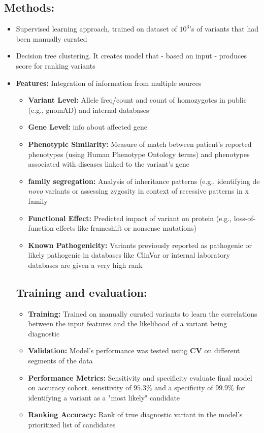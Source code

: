 \documentclass[../main.tex]{subfiles}
\begin{document}
\subsection*{Methods:} 
\begin{itemize}
    \item Supervised learning approach, trained on dataset of $10^3$'s of variants that had been manually curated
    \item Decision tree clustering. It creates model that - based on input - produces score for ranking variants
    \item \textbf{Features:} Integration of information from multiple sources
    \begin{itemize}
        \item \textbf{Variant Level:} Allele freq/count and count of homozygotes in public (e.g., gnomAD) and internal databases
        \item \textbf{Gene Level:} info about affected gene
        \item \textbf{Phenotypic Similarity:} Measure of match between patient's reported phenotypes (using Human Phenotype Ontology terms) and phenotypes associated with diseases linked to the variant's gene
        \item \textbf{family segregation:} Analysis of inheritance patterns (e.g., identifying de \textit{novo} variants or assessing zygosity in context of recessive patterns in x family
        \item \textbf{Functional Effect:} Predicted impact of variant on protein (e.g., loss-of-function effects like frameshift or nonsense mutations)
        \item \textbf{Known Pathogenicity:} Variants previously reported as pathogenic or likely pathogenic in databases like ClinVar or internal laboratory databases are given a very high rank
    \end{itemize}

\subsection*{Training and evaluation:}
\begin{itemize}
    \item \textbf{Training:} Trained on manually curated variants to learn the correlations between the input features and the likelihood of a variant being diagnostic
    \item \textbf{Validation:} Model's performance was tested using \textbf{CV} on different segments of the data
    \item \textbf{Performance Metrics:} Sensitivity and specificity evaluate final model on accuracy cohort. sensitivity of $95.3\%$ and a specificity of $99.9\%$ for identifying a variant as a "most likely" candidate
    \item \textbf{Ranking Accuracy:} Rank of true diagnostic variant in the model's prioritized list of candidates
\end{itemize}
\end{itemize}
\end{document}
